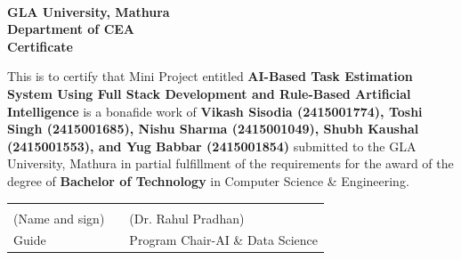 \newpage
\begin{center}
    \vspace*{0.1cm}
    \large
    \begin{flushright}
    \end{flushright}

    \\
    \textbf{GLA University, Mathura}\\
    \textbf{Department of CEA}\\
    \vspace{0.8cm}
    \large
    \textbf{Certificate}\\
    \vspace{0.5cm}
\end{center}

\noindent
{\large This is to certify that Mini Project entitled \textbf{AI-Based Task Estimation System Using Full Stack Development and Rule-Based Artificial Intelligence} is a bonafide work of \textbf{Vikash Sisodia (2415001774), Toshi Singh (2415001685), Nishu Sharma (2415001049), Shubh Kaushal (2415001553), and Yug Babbar (2415001854)} submitted to the GLA University, Mathura in partial fulfillment of the requirements for the award of the degree of \textbf{Bachelor of Technology} in Computer Science \& Engineering.}
\vspace{2cm}

\begin{table}[H]
\centering
\begin{tabular}{Y Y Y}
\hrulefill & & \hrulefill \\
\large (Name and sign) & & \large (Dr. Rahul Pradhan) \\
\large Guide & & \large Program Chair-AI \& Data Science \\
\end{tabular}
\end{table}
